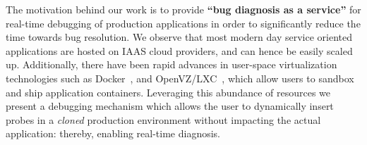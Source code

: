 
The motivation behind our work is to provide \textbf{``bug diagnosis as a service''} for real-time debugging of production applications in order to significantly reduce the time towards bug resolution.
We observe that most modern day service oriented applications are hosted on IAAS cloud providers, and can hence be easily scaled  up. 
Additionally, there have been rapid advances in user-space virtualization technologies such as Docker~\cite{docker}, and OpenVZ/LXC~\cite{openvz,lxc}, which allow users to sandbox and ship application containers. 
Leveraging this abundance of resources we present a debugging mechanism which allows the user to dynamically insert probes in a \emph{cloned} production environment without impacting the actual application: thereby, enabling real-time diagnosis.

